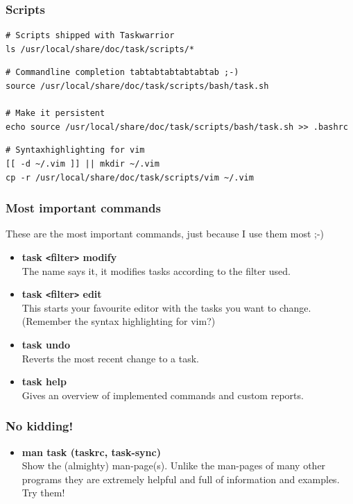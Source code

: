\documentclass[t,handout]{beamer}
\begin{document}
\begin{frame}[fragile]\frametitle{Scripts}
    \vfill
    \begin{lstlisting}
# Scripts shipped with Taskwarrior
ls /usr/local/share/doc/task/scripts/*\end{lstlisting}

\begin{lstlisting}
# Commandline completion tabtabtabtabtabtab ;-)
source /usr/local/share/doc/task/scripts/bash/task.sh

# Make it persistent
echo source /usr/local/share/doc/task/scripts/bash/task.sh >> .bashrc\end{lstlisting}

\begin{lstlisting}
# Syntaxhighlighting for vim
[[ -d ~/.vim ]] || mkdir ~/.vim
cp -r /usr/local/share/doc/task/scripts/vim ~/.vim\end{lstlisting}
\end{frame}

\begin{frame}[fragile]\frametitle{Most important commands}
    \vfill
    These are the most important commands, just because I use them most ;-)

    \begin{itemize}
        \item \textbf{task {\tt<}filter{\tt>} modify} \\
        The name says it, it modifies tasks according to the filter used. \pause
        \item \textbf{task {\tt<}filter{\tt>} edit} \\
        This starts your favourite editor with the tasks you want to change. \\
        (Remember the syntax highlighting for vim?) \pause
        \item \textbf{task undo} \\
        Reverts the most recent change to a task. \pause
        \item \textbf{task help} \\
        Gives an overview of implemented commands and custom reports.
    \end{itemize}
\end{frame}

\begin{frame}[fragile]\frametitle{No kidding!}
    \vfill
    \begin{itemize}
        \item \textbf{man task (taskrc, task-sync)} \\
        Show the (almighty) man-page(s). Unlike the man-pages of many other programs they are extremely helpful and full of information and examples. \\
        Try them!
    \end{itemize}
\end{frame}
\end{document}
